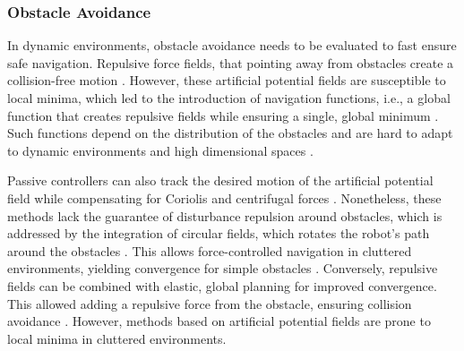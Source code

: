 \subsubsection{Obstacle Avoidance}
In dynamic environments, obstacle avoidance needs to be evaluated to fast ensure safe navigation. Repulsive force fields, that pointing away from obstacles create a collision-free motion \parencite{khatib1987unified}. 
However, these artificial potential fields are susceptible to local minima, which led to the introduction of navigation functions, i.e., a global function that creates repulsive fields while ensuring a single, global minimum \parencite{koditschek1990robot}. Such functions depend on the distribution of the obstacles and are hard to adapt to dynamic environments and high dimensional spaces \parencite{loizou2022mobile}.


Passive controllers can also track the desired motion of the artificial potential field while compensating for Coriolis and centrifugal forces \parencite{duindam2004passive}. 
Nonetheless, these methods lack the guarantee of disturbance repulsion around obstacles, which is addressed by the integration of circular fields, which rotates the robot's path around the obstacles \parencite{singh1996real}. 
This allows force-controlled navigation in cluttered environments, yielding convergence for simple obstacles \parencite{haddadin2011dynamic}. 
Conversely, repulsive fields can be combined with elastic, global planning \parencite{brock2002elastic} for improved convergence. This allowed adding a repulsive force from the obstacle, ensuring collision avoidance \parencite{tulbure2020closing}. 
However, methods based on artificial potential fields are prone to local minima in cluttered environments.

